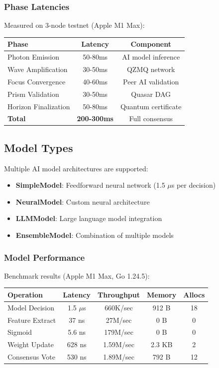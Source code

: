 \subsubsection{Phase Latencies}

Measured on 3-node testnet (Apple M1 Max):

\begin{center}
\begin{tabular}{lcc}
\toprule
\textbf{Phase} & \textbf{Latency} & \textbf{Component} \\
\midrule
Photon Emission & 50-80ms & AI model inference \\
Wave Amplification & 30-50ms & QZMQ network \\
Focus Convergence & 40-60ms & Peer AI validation \\
Prism Validation & 30-50ms & Quasar DAG \\
Horizon Finalization & 50-80ms & Quantum certificate \\
\midrule
\textbf{Total} & \textbf{200-300ms} & Full consensus \\
\bottomrule
\end{tabular}
\end{center}

\subsection{Model Types}

Multiple AI model architectures are supported:

\begin{itemize}
\item \textbf{SimpleModel}: Feedforward neural network (1.5 $\mu$s per decision)
\item \textbf{NeuralModel}: Custom neural architecture
\item \textbf{LLMModel}: Large language model integration
\item \textbf{EnsembleModel}: Combination of multiple models
\end{itemize}

\subsubsection{Model Performance}

Benchmark results (Apple M1 Max, Go 1.24.5):

\begin{center}
\begin{tabular}{lcccc}
\toprule
\textbf{Operation} & \textbf{Latency} & \textbf{Throughput} & \textbf{Memory} & \textbf{Allocs} \\
\midrule
Model Decision & 1.5 $\mu$s & 660K/sec & 912 B & 18 \\
Feature Extract & 37 ns & 27M/sec & 0 B & 0 \\
Sigmoid & 5.6 ns & 179M/sec & 0 B & 0 \\
Weight Update & 628 ns & 1.59M/sec & 2.3 KB & 2 \\
Consensus Vote & 530 ns & 1.89M/sec & 792 B & 12 \\
\bottomrule
\end{tabular}
\end{center}

